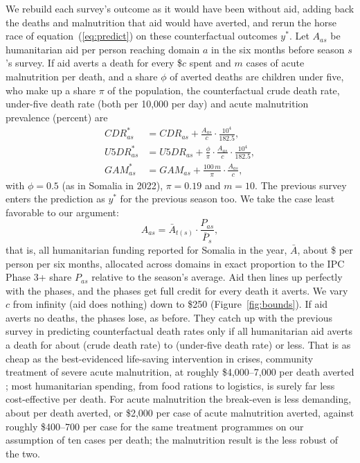 \documentclass[11pt]{article}
\begin{document}
We rebuild each survey's outcome as it would have been without aid, adding back the deaths and malnutrition that aid would have averted, and rerun the horse race of equation~(\ref{eq:predict}) on these counterfactual outcomes $y^*$. Let $A_{as}$ be humanitarian aid per person reaching domain $a$ in the six months before season $s$'s survey. If aid averts a death for every \$$c$ spent and $m$ cases of acute malnutrition per death, and a share $\phi$ of averted deaths are children under five, who make up a share $\pi$ of the population, the counterfactual crude death rate, under-five death rate (both per 10,000 per day) and acute malnutrition prevalence (percent) are
\begin{align}
\textit{CDR}^*_{as} &= \textit{CDR}_{as} + \frac{A_{as}}{c} \cdot \frac{10^4}{182.5}, \nonumber\\
\textit{U5DR}^*_{as} &= \textit{U5DR}_{as} + \frac{\phi}{\pi}\cdot\frac{A_{as}}{c} \cdot \frac{10^4}{182.5}, \label{eq:bounds}\\
\textit{GAM}^*_{as} &= \textit{GAM}_{as} + \frac{100\, m}{\pi} \cdot \frac{A_{as}}{c}, \nonumber
\end{align}
with $\phi = 0.5$ (as in Somalia in 2022), $\pi = 0.19$ and $m = 10$. The previous survey enters the prediction as $y^*$ for the previous season too. We take the case least favorable to our argument:
\begin{equation*}
A_{as} = \bar A_{t(s)} \cdot \frac{P_{as}}{\overline{P}_s},
\end{equation*}
that is, all humanitarian funding reported for Somalia in the year, $\bar A$, about \$\bdNatPc{} per person per six months, allocated across domains in exact proportion to the IPC Phase 3+ share $P_{as}$ relative to the season's average. Aid then lines up perfectly with the phases, and the phases get full credit for every death it averts. We vary $c$ from infinity (aid does nothing) down to \$250 (Figure~\ref{fig:bounds}). If aid averts no deaths, the phases lose, as before. They catch up with the previous survey in predicting counterfactual death rates only if all humanitarian aid averts a death for about \bdBreakCdrLast{} (crude death rate) to \bdBreakUfiveLast{} (under-five death rate) or less. That is as cheap as the best-evidenced life-saving intervention in crises, community treatment of severe acute malnutrition, at roughly \$4,000--7,000 per death averted \citep{givewell2024cmam,givewell2024taimaka}; most humanitarian spending, from food rations to logistics, is surely far less cost-effective per death. For acute malnutrition the break-even is less demanding, about \bdBreakGamLast{} per death averted, or \$2,000 per case of acute malnutrition averted, against roughly \$400--700 per case for the same treatment programmes on our assumption of ten cases per death; the malnutrition result is the less robust of the two.
\end{document}
